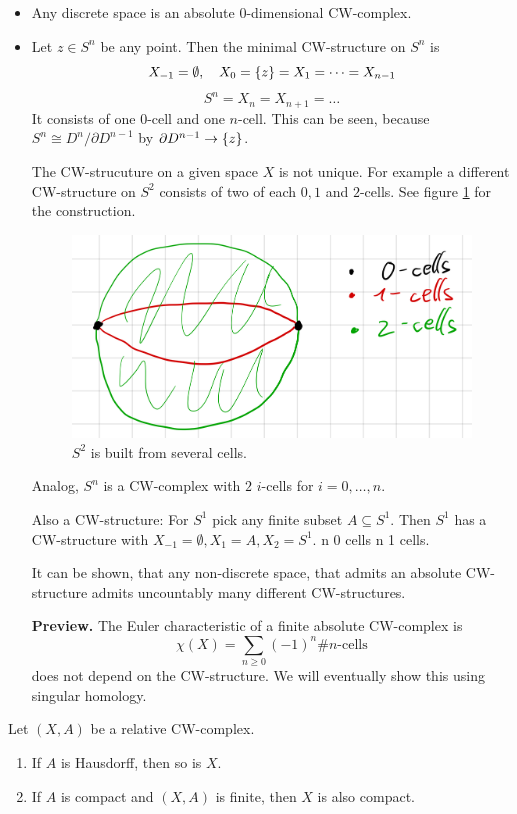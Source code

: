 \documentclass{TemplateLecture}
\begin{document}
\begin{example}
    \begin{itemize}
        \item Any discrete space is an absolute \(0\)-dimensional CW-complex.
        \item Let \(z \in S^n\) be any point. Then  the minimal CW-structure on \(S^n\) is
        \[X_{-1} = \emptyset, \quad X_0 = \{z\} = X_1 = \dots = X_{n-1}\]
        \[S^n = X_n = X_{n+1} = \dots\]
        It consists of one \(0\)-cell and one \(n\)-cell. 
        This can be seen, because \(S^n \cong D^n / \partial D^{n-1}\) by \(\partial D^{n-1} \to \{z\}\).

        The CW-strucuture on a given space \(X\) is not unique. For example a different CW-structure on \(S^2\) consists of two of each \(0,1\) and \(2\)-cells. See figure \ref{fig:exS2} for the construction.
    \begin{figure}
        \centering
        \includegraphics[width=0.5\linewidth]{pic/exS2.png}
        \caption{\(S^2\) is built from several cells.}
        \label{fig:exS2}
    \end{figure}
        Analog, \(S^n\) is a CW-complex with \(2\) \(i\)-cells for \(i = 0, \dots, n\).

        Also a CW-structure: For \(S^1\) pick any finite subset \(A \subseteq S^1\). Then \(S^1\) has a CW-structure with \(X_{-1} = \emptyset, X_1 = A, X_2 = S^1\). n 0 cells n 1 cells.

        It can be shown, that any non-discrete space, that admits an absolute CW-structure admits uncountably many different CW-structures.

        \item[\textbf{Preview.}] The Euler characteristic of a finite absolute CW-complex is
        \[\chi(X) = \sum_{n \geq 0} (-1)^n \#n\text{-cells}\]
        does not depend on the CW-structure. We will eventually show this using singular homology. 
    \end{itemize}
\end{example}

\begin{thm}{}{}
    Let \((X,A)\) be a relative CW-complex.
    \begin{enumerate}
        \item If \(A\) is Hausdorff, then so is \(X\).
        \item If \(A\) is compact and \((X,A)\) is finite, then \(X\) is also compact.
    \end{enumerate}
\end{thm}
\end{document}
